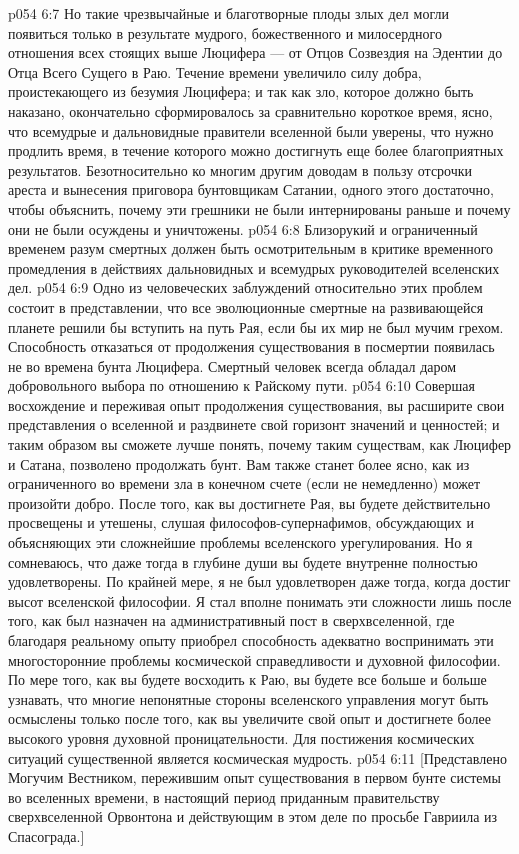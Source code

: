 \vs p054 6:7 Но такие чрезвычайные и благотворные плоды злых дел могли появиться только в результате мудрого, божественного и милосердного отношения всех стоящих выше Люцифера --- от Отцов Созвездия на Эдентии до Отца Всего Сущего в Раю. Течение времени увеличило силу добра, проистекающего из безумия Люцифера; и так как зло, которое должно быть наказано, окончательно сформировалось за сравнительно короткое время, ясно, что всемудрые и дальновидные правители вселенной были уверены, что нужно продлить время, в течение которого можно достигнуть еще более благоприятных результатов. Безотносительно ко многим другим доводам в пользу отсрочки ареста и вынесения приговора бунтовщикам Сатании, одного этого достаточно, чтобы объяснить, почему эти грешники не были интернированы раньше и почему они не были осуждены и уничтожены.
\vs p054 6:8 Близорукий и ограниченный временем разум смертных должен быть осмотрительным в критике временного промедления в действиях дальновидных и всемудрых руководителей вселенских дел.
\vs p054 6:9 Одно из человеческих заблуждений относительно этих проблем состоит в представлении, что все эволюционные смертные на развивающейся планете решили бы вступить на путь Рая, если бы их мир не был мучим грехом. Способность отказаться от продолжения существования в посмертии появилась не во времена бунта Люцифера. Смертный человек всегда обладал даром добровольного выбора по отношению к Райскому пути.
\vs p054 6:10 \pc Совершая восхождение и переживая опыт продолжения существования, вы расширите свои представления о вселенной и раздвинете свой горизонт значений и ценностей; и таким образом вы сможете лучше понять, почему таким существам, как Люцифер и Сатана, позволено продолжать бунт. Вам также станет более ясно, как из ограниченного во времени зла в конечном счете (если не немедленно) может произойти добро. После того, как вы достигнете Рая, вы будете действительно просвещены и утешены, слушая философов\hyp{}супернафимов, обсуждающих и объясняющих эти сложнейшие проблемы вселенского урегулирования. Но я сомневаюсь, что даже тогда в глубине души вы будете внутренне полностью удовлетворены. По крайней мере, я не был удовлетворен даже тогда, когда достиг высот вселенской философии. Я стал вполне понимать эти сложности лишь после того, как был назначен на административный пост в сверхвселенной, где благодаря реальному опыту приобрел способность адекватно воспринимать эти многосторонние проблемы космической справедливости и духовной философии. По мере того, как вы будете восходить к Раю, вы будете все больше и больше узнавать, что многие непонятные стороны вселенского управления могут быть осмыслены только после того, как вы увеличите свой опыт и достигнете более высокого уровня духовной проницательности. Для постижения космических ситуаций существенной является космическая мудрость.
\vsetoff
\vs p054 6:11 [Представлено Могучим Вестником, пережившим опыт существования в первом бунте системы во вселенных времени, в настоящий период приданным правительству сверхвселенной Орвонтона и действующим в этом деле по просьбе Гавриила из Спасограда.]

